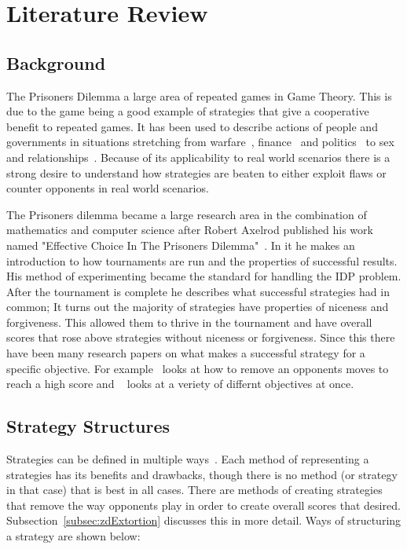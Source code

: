 
\chapter{Literature Review}\label{ch:literature}
\section{Background}\label{sec:background}
The Prisoners Dilemma a large area of repeated games in Game Theory.
This is due to the game being a good example of strategies that give a cooperative benefit to repeated games.
It has been used to describe actions of people and governments in situations stretching from warfare~\cite{tooby1988war,aumann1992handbook}, finance~\cite{cable1997finance} and politics~\cite{snidal1985Politics} to sex and relationships~\cite{low2015sex}.
Because of its applicability to real world scenarios there is a strong desire to understand how strategies are beaten to either exploit flaws or counter opponents in real world scenarios.

The Prisoners dilemma became a large research area in the combination of mathematics and computer science after Robert Axelrod published his work named "Effective Choice In The Prisoners Dilemma"~\cite{axelrod1980effective}. 
In it he makes an introduction to how tournaments are run and the properties of successful results.
His method of experimenting became the standard for handling the IDP problem.
After the tournament is complete he describes what successful strategies had in common; 
It turns out the majority of strategies have properties of niceness and forgiveness.
This allowed them to thrive in the tournament and have overall scores that rose above strategies without niceness or forgiveness. 
Since this there have been many research papers on what makes a successful strategy for a specific objective.
For example~\cite{press2012iterated} looks at how to remove an opponents moves to reach a high score and ~\cite{mittal2009optimal} looks at a veriety of differnt objectives at once.

\section{Strategy Structures}\label{sec:stratergyStructures}
Strategies can be defined in multiple ways~\cite{harper2017reinforcement}.
Each method of representing a strategies has its benefits and drawbacks, though there is no method (or strategy in that case) that is best in all cases.
There are methods of creating strategies that remove the way opponents play in order to create overall scores that desired.
Subsection~\ref{subsec:zdExtortion} discusses this in more detail.
Ways of structuring a strategy are shown below:

